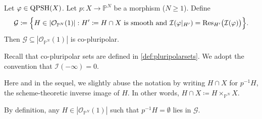 \begin{theorem}\label{thm:Bert}
Let $\varphi\in \mathrm{QPSH}(X)$. Let $p\colon X\rightarrow \mathbb{P}^N$ be a morphism ($N\geq 1$). Define
\[
\mathcal{G}\coloneqq \Bigl\{H\in |\mathcal{O}_{\mathbb{P}^N}(1)|: H'\coloneqq H\cap X \textup{ is smooth and } \mathcal{I}(\varphi|_{H'})=\operatorname{Res}_{H'}\bigl(\mathcal{I}(\varphi)\bigr)\Bigr\}.
\]
Then $\mathcal{G}\subseteq |\mathcal{O}_{\mathbb{P}^N}(1)|$ is co-pluripolar.
\end{theorem}
Recall that co-pluripolar sets are defined in \cref{def:pluripolarsets}. We adopt the convention that $\mathcal{I}(-\infty)=0$.
\begin{remark}\label{rmk:trace:L787}
Here and in the sequel, we slightly abuse the notation by writing $H\cap X$ for $p^{-1}H$, the scheme-theoretic inverse image of $H$. In other words, $H\cap X\coloneqq H\times_{\mathbb{P}^N} X$.

By definition, any $H\in |\mathcal{O}_{\mathbb{P}^N}(1)|$ such that $p^{-1}H=\emptyset$ lies in $\mathcal{G}$.
\end{remark}
